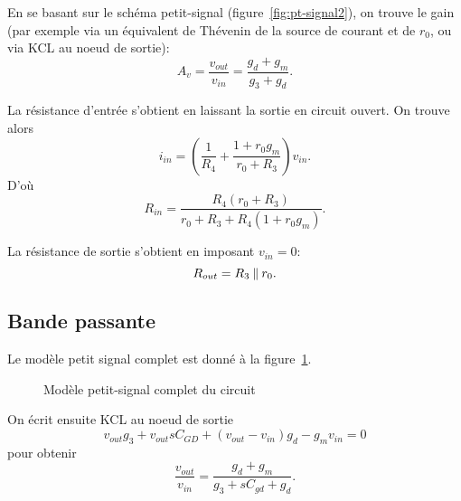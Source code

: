 \documentclass[frenchb,DIV=14]{scrartcl}
\begin{document}
En se basant sur le schéma petit-signal (figure~\ref{fig:pt-signal2}), on
trouve le gain (par exemple via un équivalent de Thévenin de la source de courant
et de $r_0$, ou via KCL au noeud de sortie):
\[A_v = \frac{v_{out}}{v_{in}} = \frac{g_d+g_m}{g_3+g_d}. \]

La résistance d'entrée s'obtient en laissant la sortie en circuit ouvert.
On trouve alors
\[i_{in} = \left(\frac{1}{R_4} + \frac{1+r_0 g_m}{r_0 + R_3}\right) v_{in}.\]
D'où
\[R_{in} = \frac{R_4 (r_0 + R_3)}{r_0 + R_3 + R_4 (1+r_0 g_m)}.\]

La résistance de sortie s'obtient en imposant $v_{in} = 0$:
\[R_{out} = R_3 \mathbin{\|} r_0.\]

\subsection*{Bande passante}
Le modèle petit signal complet est donné à la figure~\ref{fig:pt-signal3}.

\begin{figure}[h]
    \centering
    \caption{Modèle petit-signal complet du circuit}
    \label{fig:pt-signal3}
\end{figure}

On écrit ensuite KCL au noeud de sortie
\[ v_{out}g_3 + v_{out}sC_{GD} + (v_{out}-v_{in})g_d - g_mv_{in} = 0\]
pour obtenir
\[ \frac{v_{out}}{v_{in}} = \frac{g_d+g_m}{g_3+sC_{gd}+g_d}.\]
\end{document}
